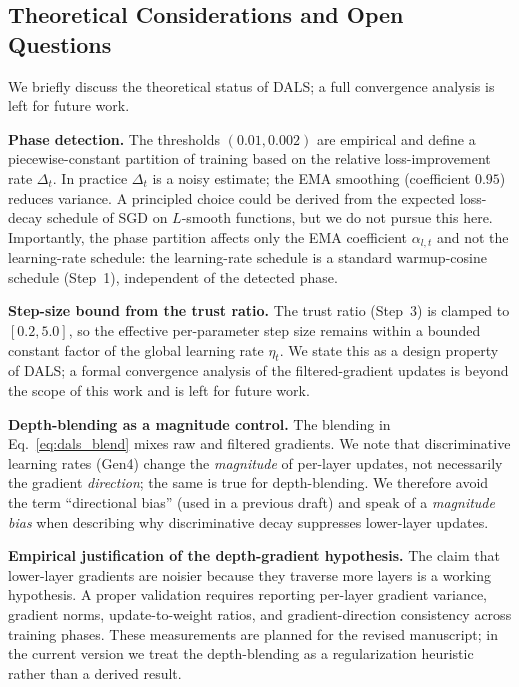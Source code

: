 \documentclass[a4paper,fleqn]{cas-dc}
\begin{document}
\subsection{Theoretical Considerations and Open Questions}\label{sec:theory}

We briefly discuss the theoretical status of DALS; a full convergence analysis is left for future work.

\textbf{Phase detection.} The thresholds $(0.01,0.002)$ are empirical and define a piecewise-constant partition of training based on the relative loss-improvement rate $\Delta_t$. In practice $\Delta_t$ is a noisy estimate; the EMA smoothing (coefficient $0.95$) reduces variance. A principled choice could be derived from the expected loss-decay schedule of SGD on $L$-smooth functions, but we do not pursue this here. Importantly, the phase partition affects only the EMA coefficient $\alpha_{l,t}$ and not the learning-rate schedule: the learning-rate schedule is a standard warmup-cosine schedule (Step~1), independent of the detected phase.

\textbf{Step-size bound from the trust ratio.} The trust ratio (Step~3) is clamped to $[0.2,5.0]$, so the effective per-parameter step size remains within a bounded constant factor of the global learning rate $\eta_t$. We state this as a design property of DALS; a formal convergence analysis of the filtered-gradient updates is beyond the scope of this work and is left for future work.

\textbf{Depth-blending as a magnitude control.} The blending in Eq.~\eqref{eq:dals_blend} mixes raw and filtered gradients. We note that discriminative learning rates (Gen4) change the \emph{magnitude} of per-layer updates, not necessarily the gradient \emph{direction}; the same is true for depth-blending. We therefore avoid the term ``directional bias'' (used in a previous draft) and speak of a \emph{magnitude bias} when describing why discriminative decay suppresses lower-layer updates.

\textbf{Empirical justification of the depth-gradient hypothesis.} The claim that lower-layer gradients are noisier because they traverse more layers is a working hypothesis. A proper validation requires reporting per-layer gradient variance, gradient norms, update-to-weight ratios, and gradient-direction consistency across training phases. These measurements are planned for the revised manuscript; in the current version we treat the depth-blending as a regularization heuristic rather than a derived result.
\end{document}

